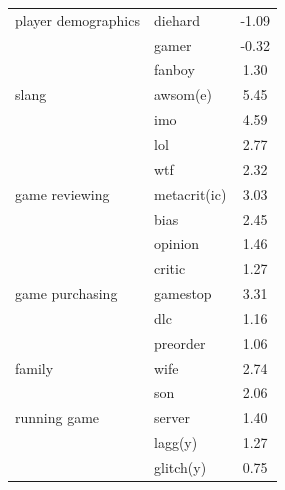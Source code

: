 \documentclass{sig-alternate}
\begin{document}
\begin{table}[tb!]
\begin{tabular}{llc}

\midrule 
player demographics 
& diehard & -1.09 \\ 
& gamer & -0.32 \\ 
& fanboy & 1.30 \\ [2ex]

\midrule 
slang 
& awsom(e) & 5.45 \\ 
& imo & 4.59 \\ 
& lol & 2.77 \\ 
& wtf & 2.32 \\ [2ex]

\midrule 
game reviewing 
& metacrit(ic) & 3.03 \\ 
& bias & 2.45 \\ 
& opinion & 1.46 \\ 
& critic & 1.27 \\ [2ex]

\midrule 
game purchasing 
& gamestop & 3.31 \\ 
& dlc & 1.16 \\ 
& preorder & 1.06 \\ [2ex]

\midrule 
family 
& wife & 2.74 \\ 
& son & 2.06 \\ [2ex]

\midrule 
running game 
& server & 1.40 \\ 
& lagg(y) & 1.27 \\ 
& glitch(y) & 0.75 \\ [2ex]


\end{tabular}
\end{table}
\end{document}
